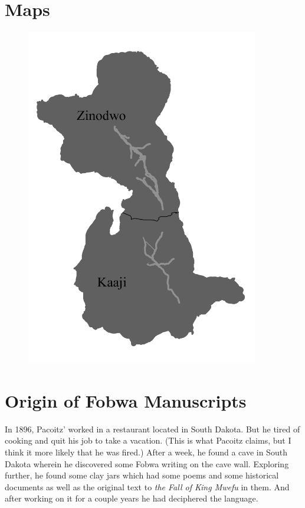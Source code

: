 \chapter{Maps}
\begin{figure}[ht!]
\centering
\includegraphics[width=4in]{Twizwa_map2.png}
\end{figure}

\chapter{Origin of Fobwa Manuscripts}
In 1896, Pacoitz' worked in a restaurant located in South Dakota. But he tired of cooking and quit his job to take a vacation. (This is what Pacoitz claims, but I think it more likely that he was fired.) After a week, he found a cave in South Dakota wherein he discovered some Fobwa writing on the cave wall. Exploring further, he found some clay jars which had some poems and some historical documents as well as the original text to \emph{the Fall of King Mwefu} in them. And after working on it for a couple years he had deciphered the language.

